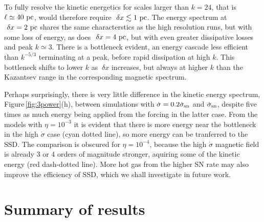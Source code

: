 \documentclass[preprint2]{aastex63}
\newcommand\SNr{\dot\sigma_{\rm sn}}
\newcommand\pc{~ {\rm pc}}
\newcommand\dx{~ {\delta x}}
\begin{document}
To fully resolve the kinetic energetics for scales larger than $k=24$, that is
$\ell\simeq40\pc$, would therefore require $\dx\lesssim1\pc$.
The energy spectrum at $\dx=2\pc$ shares the same characterstics as the high
resolution runs, but with some loss of energy, as does $\dx=4\pc$, but with 
even greater dissipative losses and peak $k\simeq3$.
There is a bottleneck evident, an energy cascade less efficient than $k^{-5/3}$
terminating at a peak, before rapid dissipation at high $k$.
This bottleneck shifts to lower $k$ as $\dx$ increases, but always at higher
$k$ than the Kazantsev range in the corresponding magnetic spectrum.

Perhaps surprisingly, there is very little difference in the kinetic energy
spectrum, Figure\,\ref{fig:3power}(h), between simulations with
$\dot\sigma=0.2\SNr$ and $\SNr$, despite five times as much energy being 
applied from the forcing in the latter case.
From the models with $\eta=10^{-3}$ it is evident that there is more energy
near the bottleneck in the high $\dot\sigma$ case (cyan dotted line), so more
energy can be tranferred to the SSD.
The comparison is obscured for $\eta=10^{-4}$, because the high $\dot\sigma$
magnetic field is already 3 or 4 orders of magnitude stronger, aquiring some of
the kinetic energy (red dash-dotted line).
More hot gas from the higher SN rate may also improve the efficiency of SSD,
which we shall investigate in future work.  



\section{Summary of results}\label{sec:conc}
\end{document}
